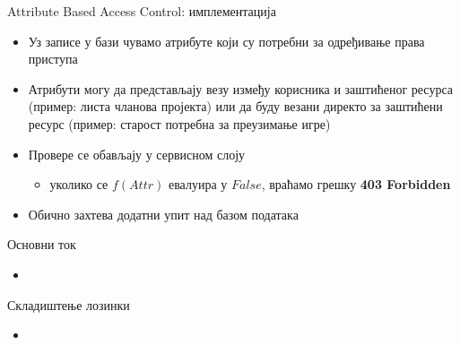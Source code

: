 \documentclass{beamer}
\begin{document}
    \begin{frame}{Attribute Based Access Control: имплементација}
        \begin{itemize}
            \item Уз записе у бази чувамо атрибуте који су потребни за одређивање права приступа
            \item Атрибути могу да представљају везу између корисника и заштићеног ресурса (пример: листа чланова пројекта) или да буду везани директо за заштићени ресурс (пример: старост потребна за преузимање игре)
            \item Провере се обављају у сервисном слоју
            \begin{itemize}
                \item уколико се \begin{math}f(Attr)\end{math} евалуира у \begin{math}False\end{math}, враћамо грешку \textbf{403 Forbidden}
            \end{itemize}
            \item Обично захтева додатни упит над базом података
        \end{itemize}
    \end{frame}
    
    \begin{frame}{Основни ток}
        \begin{itemize}
            \item 
        \end{itemize}
    \end{frame}
    
    \begin{frame}{Складиштење лозинки}
        \begin{itemize}
            \item 
        \end{itemize}
    \end{frame}
    
\end{document}
